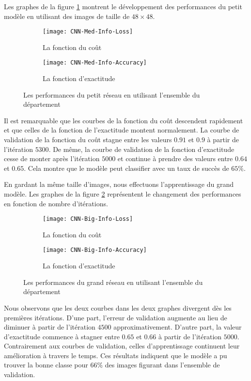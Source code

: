 Les graphes de la figure \ref{fig:med_info} montrent le développement des performances
du petit modèle en utilisant des images de taille de $48 \times 48$.

\begin{figure}[h]
\centering
\begin{subfigure}{0.9\textwidth}
  \texttt{[image: CNN-Med-Info-Loss]}
  \caption{La fonction du coût}
\end{subfigure}
\begin{subfigure}{0.9\textwidth}
  \texttt{[image: CNN-Med-Info-Accuracy]}
  \caption{La fonction d'exactitude}
\end{subfigure}
\caption{Les performances du petit réseau en utilisant l'ensemble du département\label{fig:med_info}}
\end{figure}

Il est remarquable que les courbes de la fonction du coût descendent rapidement
et que celles de la fonction de l'exactitude montent normalement. La courbe de
validation de la fonction du coût stagne entre les valeurs $0.91$ et $0.9$ à partir
de l'itération $5300$. De même, la courbe de validation de la fonction d'exactitude
cesse de monter après l'itération $5000$ et continue à prendre des valeurs entre
$0.64$ et $0.65$. Cela montre que le modèle peut classifier avec un taux de
succès de $65 \%$.

En gardant la même taille d'images, nous effectuons l'apprentissage du grand modèle.
Les graphes de la figure \ref{fig:big_info} représentent le changement des performances en fonction de
nombre d'itérations.

\begin{figure}[h]
\centering
\begin{subfigure}{0.9\textwidth}
  \texttt{[image: CNN-Big-Info-Loss]}
  \caption{La fonction du coût}
\end{subfigure}
\begin{subfigure}{0.9\textwidth}
  \texttt{[image: CNN-Big-Info-Accuracy]}
  \caption{La fonction d'exactitude}
\end{subfigure}
\caption{Les performances du grand réseau en utilisant l'ensemble du département\label{fig:big_info}}
\end{figure}

Nous observons que les deux courbes dans les deux graphes divergent dès les
premières itérations. D'une part, l'erreur de validation augmente au lieu de diminuer
à partir de l'itération $4500$ approximativement. D'autre part, la valeur d'exactitude
commence à stagner entre $0.65$ et $0.66$ à partir de l'itération $5000$. Contrairement
aux courbes de validation, celles d'apprentissage continuent leur amélioration
à travers le temps. Ces résultats indiquent que le modèle a pu trouver la bonne
classe pour $66 \%$ des images figurant dans l'ensemble de validation.


